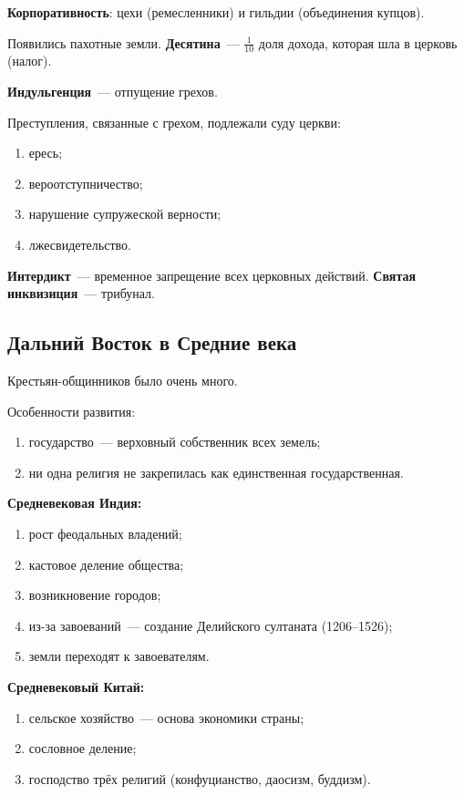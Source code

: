 \documentclass[a4paper, 12pt]{article}
\begin{document}
\textbf{Корпоративность}: цехи (ремесленники) и гильдии (объединения
купцов).

Появились пахотные земли. \textbf{Десятина}~--- $\frac{1}{10}$ доля дохода,
которая шла в церковь (налог).

\textbf{Индульгенция}~--- отпущение грехов.

Преступления, связанные с грехом, подлежали суду церкви:
\begin{enumerate}[noitemsep]
  \item ересь;
  \item вероотступничество;
  \item нарушение супружеской верности;
  \item лжесвидетельство.
\end{enumerate}

\textbf{Интердикт}~--- временное запрещение всех церковных действий.
\textbf{Святая инквизиция}~--- трибунал.

\subsection{Дальний Восток в Средние века}
Крестьян-общинников было очень много.

Особенности развития:
\begin{enumerate}[noitemsep]
  \item государство~--- верховный собственник всех земель;
  \item ни одна религия не закрепилась как единственная государственная.
\end{enumerate}

\textbf{Средневековая Индия:}
\begin{enumerate}[noitemsep]
  \item рост феодальных владений;
  \item кастовое деление общества;
  \item возникновение городов;
  \item из-за завоеваний~--- создание Делийского султаната (1206--1526);
  \item земли переходят к завоевателям.
\end{enumerate}

\textbf{Средневековый Китай:}
\begin{enumerate}[noitemsep]
  \item сельское хозяйство~--- основа экономики страны;
  \item сословное деление;
  \item господство трёх религий (конфуцианство, даосизм, буддизм).
\end{enumerate}
\end{document}

